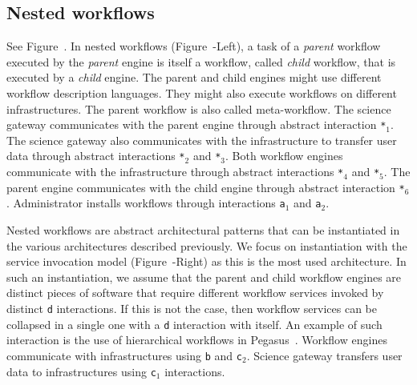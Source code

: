 \documentclass[preprint,3p,twocolumn]{elsarticle}
\begin{document}
\subsection{Nested workflows}

See Figure~. In nested workflows
(Figure~-Left), a task of a \emph{parent}
workflow executed by the \emph{parent} engine is itself a workflow,
called \emph{child} workflow, that is executed by a \emph{child}
engine. The parent and child engines might use different workflow
description languages. They might also execute workflows on different
infrastructures. The parent workflow is also called meta-workflow. The
science gateway communicates with the parent engine through abstract
interaction \texttt{*$_1$}. The science gateway also communicates with
the infrastructure to transfer user data through abstract interactions
\texttt{*$_2$} and \texttt{*$_3$}. Both workflow engines communicate
with the infrastructure through abstract interactions \texttt{*$_4$}
and \texttt{*$_5$}. The parent engine communicates with the child
engine through abstract interaction \texttt{*$_6$}. Administrator
installs workflows through interactions \texttt{a$_1$} and
\texttt{a$_2$}.

Nested workflows are abstract architectural patterns that can be
instantiated in the various architectures described previously. We
focus on instantiation with the service invocation model
(Figure~-Right) as this is the most used
architecture. In such an instantiation, we assume that the parent and
child workflow engines are distinct pieces of software that require
different workflow services invoked by distinct \texttt{d}
interactions. If this is not the case, then workflow services can be
collapsed in a single one with a \texttt{d} interaction with
itself. An example of such interaction is the use of hierarchical
workflows in Pegasus~\cite{Deelman201517}.
Workflow engines communicate with infrastructures using
\texttt{b} and \texttt{c$_2$}. Science gateway transfers user data to
infrastructures using \texttt{c$_1$} interactions.
\end{document}
